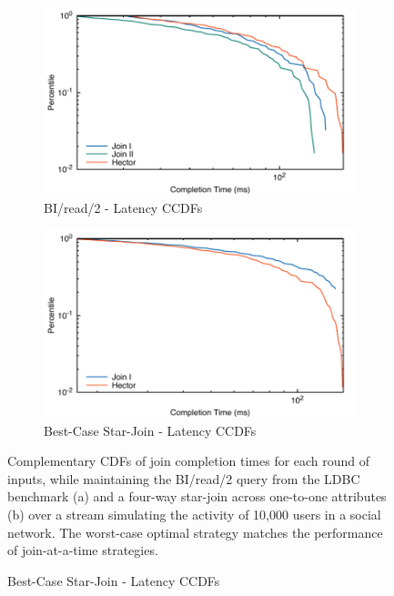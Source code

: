 \documentclass[../catalog.tex]{subfiles}
\begin{document}
\begin{figure}
  \begin{subfigure}{.5\textwidth}
    \centering
    \includegraphics[width=1.0\linewidth]{results/bi_read_2/out/all_cdfs}
    \caption{BI/read/2 - Latency CCDFs}
    \label{fig:average-cdfs}
  \end{subfigure}
  \begin{subfigure}{.5\textwidth}
    \centering
    \includegraphics[width=1.0\linewidth]{results/best_case/out/all_cdfs}
    \caption{Best-Case Star-Join - Latency CCDFs}
    \label{fig:best-case-cdfs}
  \end{subfigure}

  \medskip
  \small

  Complementary CDFs of join completion times for each round of
  inputs, while maintaining the BI/read/2 query from the LDBC
  benchmark (a) and a four-way star-join across one-to-one attributes
  (b) over a stream simulating the activity of 10,000 users in a
  social network. The worst-case optimal strategy matches the
  performance of join-at-a-time strategies.
\end{figure}
\end{document}
